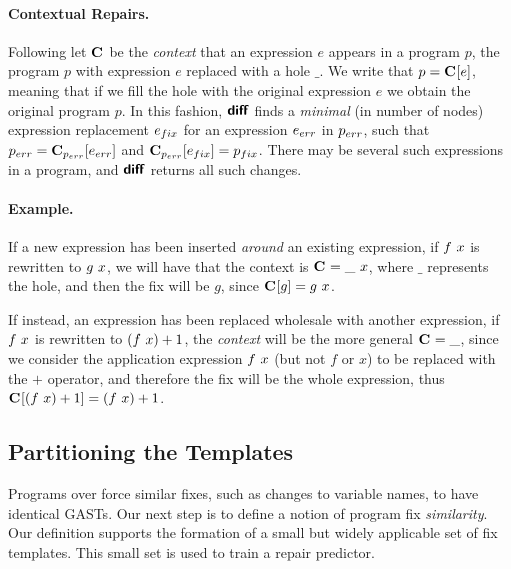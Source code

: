 \paragraph{Contextual Repairs.}
%
Following \cite{Felleisen92} let $\mathbf{C}_{}$ be the \emph{context} that an
expression $e$ appears in a program $p$, \ie the program $p$ with expression $e$
replaced with a hole $\_$.
%
We write that $p = \mathbf{C}_{}[e]$, meaning that if we fill the hole with the
original expression $e$ we obtain the original program $p$.
%
In this fashion, $\bm{\mathsf{diff}}$ finds a \emph{minimal} (in number of nodes)
expression replacement $e_{fix}$ for an expression $e_{err}$ in $p_{err}$, such that
$p_{err} = \mathbf{C}_{p_{err}}[e_{err}]$ and $\mathbf{C}_{p_{err}}[e_{fix}] = p_{fix}$.
%
There may be several such expressions in a program, and $\bm{\mathsf{diff}}$ returns all
such changes.

\paragraph{Example.}
If a new expression has been inserted \emph{around} an existing expression, \eg
if $f\ x$ is rewritten to $g\ x$, we will have that the context is
$\mathbf{C}_{} = \_\ x$, where $\_$ represents the hole, and then the fix
will be $g$, since $\mathbf{C}_{}[g] = g\ x$.

If instead, an expression has been replaced wholesale with another expression,
\eg if $f\ x$ is rewritten to $(f\ x) + 1$, the
\emph{context} will be the more general $\mathbf{C}_{} = \_$, since we consider
the application expression $f\ x$ (but not $f$ or $x$) to be replaced
with the $+$ operator, and therefore the fix will be the whole expression, thus
$\mathbf{C}_{}[(f\ x) + 1] = (f\ x) + 1$.

\subsection{Partitioning the Templates}

Programs over \lang force similar fixes, such as changes to variable names, to
have identical GASTs. Our next step is to define a notion of program fix
\emph{similarity}. Our definition supports the formation of a small but widely
applicable set of fix templates. This small set is used to train a repair
predictor.

